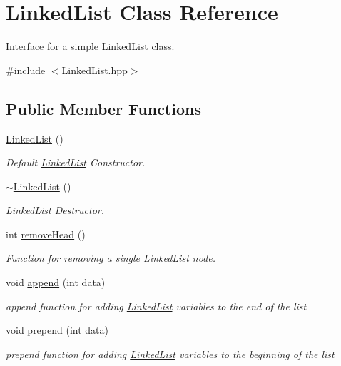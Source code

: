 \hypertarget{classLinkedList}{\section{\-Linked\-List \-Class \-Reference}
\label{classLinkedList}
}


\-Interface for a simple \hyperlink{classLinkedList}{\-Linked\-List} class.  




{\ttfamily \#include $<$\-Linked\-List.\-hpp$>$}

\subsection*{\-Public \-Member \-Functions}
\begin{DoxyCompactItemize}
\item 
\hyperlink{classLinkedList_afe7f78983e173f8018927cf2ad11a5aa}{\-Linked\-List} ()
\begin{DoxyCompactList}\small\item\em \-Default \hyperlink{classLinkedList}{\-Linked\-List} \-Constructor. \end{DoxyCompactList}\item 
\hyperlink{classLinkedList_a35811ed58ff0d8d9cc9b309b8d8f5111}{$\sim$\-Linked\-List} ()
\begin{DoxyCompactList}\small\item\em \hyperlink{classLinkedList}{\-Linked\-List} \-Destructor. \end{DoxyCompactList}\item 
int \hyperlink{classLinkedList_abd89fecfe1ce695b67aaab606d0e3cbc}{remove\-Head} ()
\begin{DoxyCompactList}\small\item\em \-Function for removing a single \hyperlink{classLinkedList}{\-Linked\-List} node. \end{DoxyCompactList}\item 
void \hyperlink{classLinkedList_aa2cb7130bb274bf5df407dead583d06a}{append} (int data)
\begin{DoxyCompactList}\small\item\em append function for adding \hyperlink{classLinkedList}{\-Linked\-List} variables to the end of the list \end{DoxyCompactList}\item 
void \hyperlink{classLinkedList_a34503bbeac8d430640b67834585c9e4c}{prepend} (int data)
\begin{DoxyCompactList}\small\item\em prepend function for adding \hyperlink{classLinkedList}{\-Linked\-List} variables to the beginning of the list \end{DoxyCompactList}\item 

\end{DoxyCompactItemize}
